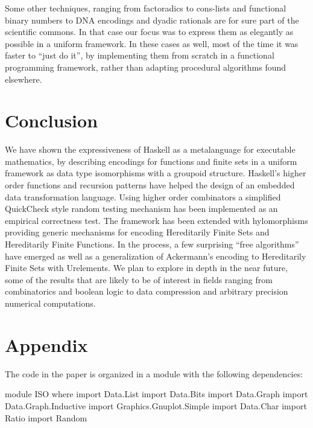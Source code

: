 \documentclass[]{INCLUDES/llncs}
\begin{document}
Some other techniques, ranging from
factoradics to cons-lists and
functional binary numbers
to DNA encodings and dyadic rationals are
for sure part of the scientific commons. 
In that
case our focus was to express them as
elegantly as possible in a uniform framework.
In these cases as well, most of the time
it was faster to ``just do it'', by implementing
them from scratch in a functional programming 
framework, rather than adapting procedural 
algorithms found elsewhere.

\section{Conclusion} \label{concl}
We have shown the expressiveness of Haskell as a
metalanguage for executable mathematics, by describing
encodings
for functions and finite sets
in a uniform framework
as data type isomorphisms with a groupoid structure.
Haskell's higher order functions and recursion patterns
have helped the design of an embedded data transformation
language.
Using higher order combinators a 
simplified QuickCheck style random testing
mechanism has been implemented as
an empirical correctness test.
The framework has been extended
with hylomorphisms providing
generic mechanisms for encoding
Hereditarily Finite Sets and 
Hereditarily Finite Functions.
In the process, a few surprising
``free algorithms'' have emerged
as well as a generalization of
Ackermann's encoding to Hereditarily Finite 
Sets with Urelements. We plan to explore in
depth in the near future, some of the results
that are likely to be of interest in fields
ranging from combinatorics and boolean logic
to data compression and arbitrary precision
numerical computations.


%
%
%
%


\section*{Appendix}

The code in the paper is organized in a module with the following dependencies:

\begin{codex}
module ISO where
import Data.List
import Data.Bits
import Data.Graph
import Data.Graph.Inductive
import Graphics.Gnuplot.Simple
import Data.Char
import Ratio
import Random
\end{codex}
\end{document}
